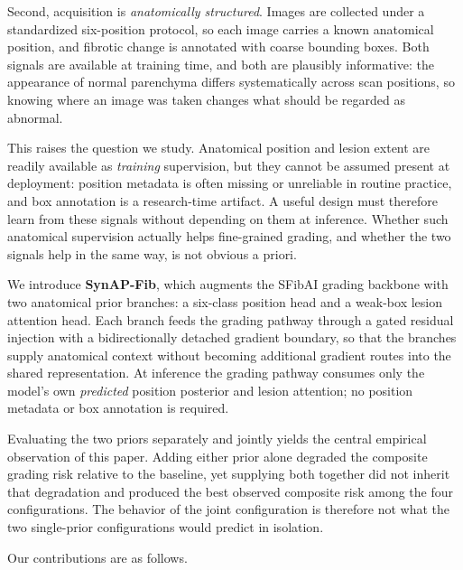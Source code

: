 Second, acquisition is \emph{anatomically structured}. Images are collected
under a standardized six-position protocol, so each image carries a known
anatomical position, and fibrotic change is annotated with coarse bounding
boxes. Both signals are available at training time, and both are plausibly
informative: the appearance of normal parenchyma differs systematically across
scan positions, so knowing where an image was taken changes what should be
regarded as abnormal.

This raises the question we study. Anatomical position and lesion extent are
readily available as \emph{training} supervision, but they cannot be assumed
present at deployment: position metadata is often missing or unreliable in
routine practice, and box annotation is a research-time artifact. A useful
design must therefore learn from these signals without depending on them at
inference. Whether such anatomical supervision actually helps fine-grained
grading, and whether the two signals help in the same way, is not obvious a
priori.

We introduce \textbf{SynAP-Fib}, which augments the SFibAI grading backbone
with two anatomical prior branches: a six-class position head and a weak-box
lesion attention head. Each branch feeds the grading pathway through a gated
residual injection with a bidirectionally detached gradient boundary, so that
the branches supply anatomical context without becoming additional gradient
routes into the shared representation. At inference the grading pathway
consumes only the model's own \emph{predicted} position posterior and lesion
attention; no position metadata or box annotation is required.

Evaluating the two priors separately and jointly yields the central empirical
observation of this paper. Adding either prior alone degraded the composite
grading risk relative to the baseline, yet supplying both together did not
inherit that degradation and produced the best observed composite risk among
the four configurations. The behavior of the joint configuration is therefore
not what the two single-prior configurations would predict in isolation.

Our contributions are as follows.

